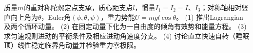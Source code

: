 质量\(m\)的重对称陀螺定点支承，质心距支点\(l\)，惯量\(I_1=I_2=I\)、\(I_3\)；对称轴相对竖直向上角为\(\theta\)，Euler角\((\phi,\theta,\psi)\)，重力势能\(U=mgl\cos\theta\)。
(1) 推出Lagrangian及两个循环动量。
(2) 在固定动量下化为一自由度的倾角有效势和能量方程。
(3) 求匀速规则进动的平衡条件及相应进动角速度分支。
(4) 讨论直立快速自转（睡眠顶）线性稳定临界角动量并检验重力零极限。
